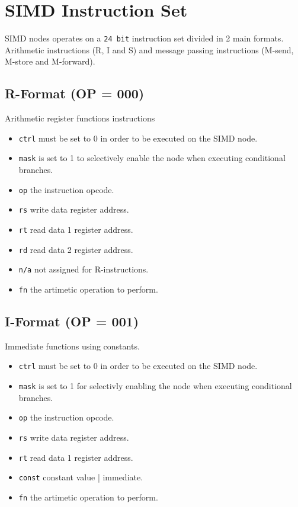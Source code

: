 \section{SIMD Instruction Set}

SIMD nodes operates on a {\tt 24 bit} instruction set divided in 2 main
formats. Arithmetic instructions (R, I and S) and message passing instructions
(M-send, M-store and M-forward). 

\subsection[R-Format]{R-Format (OP = 000)}
Arithmetic register functions instructions



\begin{itemize}
\item {\tt ctrl} must be set to 0 in order to be executed on the SIMD node.
\item {\tt mask} is set to 1 to selectively enable the node when executing
  conditional branches.
\item {\tt op} the instruction opcode.
\item {\tt rs} write data register address.
\item {\tt rt} read data 1 register address.
\item {\tt rd} read data 2 register address.
\item {\tt n/a} not assigned for R-instructions.
\item {\tt fn} the artimetic operation to perform.
\end{itemize}



\subsection[I-Format]{I-Format (OP = 001)}
Immediate functions using constants.



\begin{itemize}
\item {\tt ctrl} must be set to 0 in order to be executed on the SIMD node.
\item {\tt mask} is set to 1 for selectivly enabling the node when executing
  conditional branches.
\item {\tt op} the instruction opcode.
\item {\tt rs} write data register address.
\item {\tt rt} read data 1 register address.
\item {\tt const} constant value | immediate.
\item {\tt fn} the artimetic operation to perform.
\end{itemize}

